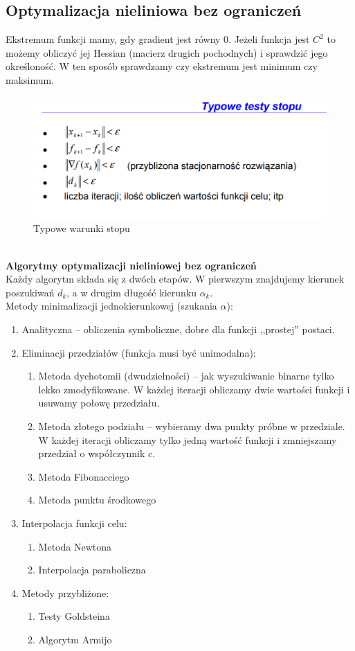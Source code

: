 \documentclass[12pt]{article}
\begin{document}
\subsection{Optymalizacja nieliniowa bez ograniczeń}
Ekstremum funkcji mamy, gdy gradient jest równy 0. Jeżeli funkcja jest $C^{2}$ to możemy obliczyć jej Hessian (macierz drugich pochodnych) i sprawdzić jego określoność. W ten sposób sprawdzamy czy ekstremum jest minimum czy maksimum. 

\begin{figure}[H]
	\centering
	\includegraphics[scale=0.7]{Pictures/warunki_stopu}
	\caption{Typowe warunki stopu}
\end{figure}
~\\
\textbf{Algorytmy optymalizacji nieliniowej bez ograniczeń}\\
Każdy algorytm składa się z dwóch etapów. W pierwszym znajdujemy kierunek poszukiwań $d_{k}$, a w drugim długość kierunku $\alpha _{k}$.\\

Metody minimalizacji jednokierunkowej (szukania $\alpha$):
\begin{enumerate}
	\item Analityczna -- obliczenia symboliczne, dobre dla funkcji ,,prostej'' postaci.
	\item Eliminacji przedziałów (funkcja musi być unimodalna):
	\begin{enumerate}
		\item Metoda dychotomii (dwudzielności) -- jak wyszukiwanie binarne tylko lekko zmodyfikowane. W każdej iteracji obliczamy dwie wartości funkcji i usuwamy połowę przedziału.
		\item Metoda złotego podziału -- wybieramy dwa punkty próbne w przedziale. W każdej iteracji obliczamy tylko jedną wartość funkcji i zmniejszamy przedział o współczynnik $c$.
		\item Metoda Fibonacciego
		\item Metoda punktu środkowego
	\end{enumerate}
	\item Interpolacja funkcji celu:
	\begin{enumerate}
		\item Metoda Newtona
		\item Interpolacja paraboliczna
	\end{enumerate}
	\item Metody przybliżone:
	\begin{enumerate}
		\item Testy Goldsteina
		\item Algorytm Armijo
	\end{enumerate}
\end{enumerate}
\end{document}
